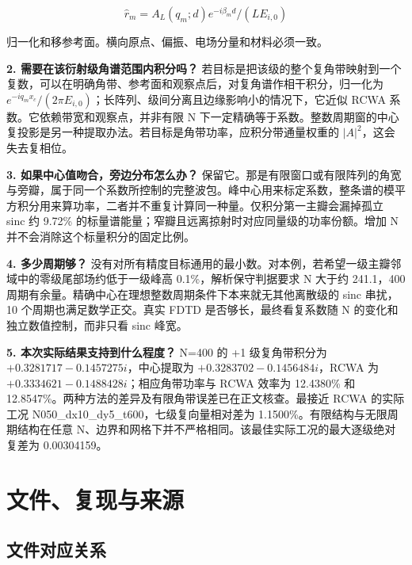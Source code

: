 \documentclass[
  chinese,
  UTF8,
  a4paper,
  11pt]{ctexart}
\begin{document}
\[\boxed{\widehat r_m=A_L(q_m;d)e^{-i\beta_md}/(L E_{i,0})}\]

归一化和移参考面。横向原点、偏振、电场分量和材料必须一致。

\textbf{2. 需要在该衍射级角谱范围内积分吗？}
若目标是把该级的整个复角带映射到一个复数，可以在明确角带、参考面和观察点后，对复角谱作相干积分，归一化为
\(e^{-iq_mx_c}/(2\pi E_{i,0})\)；长阵列、级间分离且边缘影响小的情况下，它近似
RCWA 系数。它依赖带宽和观察点，并非有限 N
下一定精确等于系数。整数周期窗的中心复投影是另一种提取办法。若目标是角带功率，应积分带通量权重的
\(|A|^2\)，这会失去复相位。

\textbf{3. 如果中心值吻合，旁边分布怎么办？}
保留它。那是有限窗口或有限阵列的角宽与旁瓣，属于同一个系数所控制的完整波包。峰中心用来标定系数，整条谱的模平方积分用来算功率，二者并不重复计算同一种量。仅积分第一主瓣会漏掉孤立
sinc 约 9.72\% 的标量谱能量；窄瓣且远离掠射时对应同量级的功率份额。增加
N 并不会消除这个标量积分的固定比例。

\textbf{4. 多少周期够？}
没有对所有精度目标通用的最小数。对本例，若希望一级主瓣邻域中的零级尾部场约低于一级峰高
0.1\%，解析保守判据要求 N 大于约 241.1，400
周期有余量。精确中心在理想整数周期条件下本来就无其他离散级的 sinc
串扰，10 个周期也满足数学正交。真实 FDTD 是否够长，最终看复系数随 N
的变化和独立数值控制，而非只看 sinc 峰宽。

\textbf{5. 本次实际结果支持到什么程度？} N=400 的 +1 级复角带积分为
\(+0.3281717 -0.1457275i\)，中心提取为 \(+0.3283702 -0.1456484i\)，RCWA
为 \(+0.3334621 -0.1488428i\)；相应角带功率与 RCWA 效率为 12.4380\% 和
12.8547\%。两种方法的差异及有限角带误差已在正文核查。最接近 RCWA
的实际工况 N050\_dx10\_dy5\_t600，七级复向量相对差为
1.1500\%。有限结构与无限周期结构在任意
N、边界和网格下并不严格相同。该最佳实际工况的最大逐级绝对复差为
0.00304159。

\section{文件、复现与来源}\label{ux6587ux4ef6ux590dux73b0ux4e0eux6765ux6e90}

\subsection{文件对应关系}\label{ux6587ux4ef6ux5bf9ux5e94ux5173ux7cfb}
\end{document}
